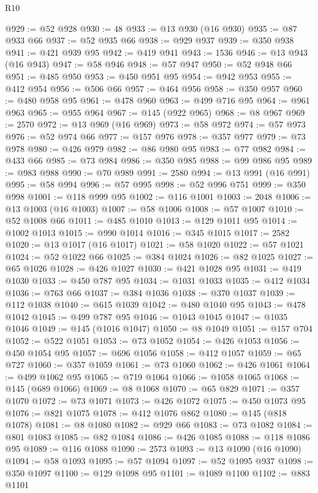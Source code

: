 \begin{lexlean}{R10}
\begin{coremodule}
@929 := @52 @928
@930 := 48
@933 := @13 @930 (@16 @930)
@935 := @87 @933 @66
@937 := @52 @935 @66
@938 := @929 @937
@939 := @350 @938
@941 := @421 @939 @95
@942 := @419 @941
@943 := 1536
@946 := @13 @943 (@16 @943)
@947 := @58 @946
@948 := @57 @947
@950 := @52 @948 @66
@951 := @485 @950
@953 := @450 @951 @95
@954 := @942 @953
@955 := @412 @954
@956 := @506 @66
@957 := @464 @956
@958 := @350 @957
@960 := @480 @958 @95
@961 := @478 @960
@963 := @499 @716 @95
@964 := @961 @963
@965 := @955 @964
@967 := @145 (@922 @965)
@968 := @8 @967
@969 := 2570
@972 := @13 @969 (@16 @969)
@973 := @58 @972
@974 := @57 @973
@976 := @52 @974 @66
@977 := @157 @976
@978 := @357 @977
@979 := @73 @978
@980 := @426 @979
@982 := @86 @980 @95
@983 := @77 @982
@984 := @433 @66
@985 := @73 @984
@986 := @350 @985
@988 := @99 @986 @95
@989 := @983 @988
@990 := @70 @989
@991 := 2580
@994 := @13 @991 (@16 @991)
@995 := @58 @994
@996 := @57 @995
@998 := @52 @996 @751
@999 := @350 @998
@1001 := @118 @999 @95
@1002 := @116 @1001
@1003 := 2048
@1006 := @13 @1003 (@16 @1003)
@1007 := @58 @1006
@1008 := @57 @1007
@1010 := @52 @1008 @66
@1011 := @485 @1010
@1013 := @129 @1011 @95
@1014 := @1002 @1013
@1015 := @990 @1014
@1016 := @345 @1015
@1017 := 2582
@1020 := @13 @1017 (@16 @1017)
@1021 := @58 @1020
@1022 := @57 @1021
@1024 := @52 @1022 @66
@1025 := @384 @1024
@1026 := @82 @1025
@1027 := @65 @1026
@1028 := @426 @1027
@1030 := @421 @1028 @95
@1031 := @419 @1030
@1033 := @450 @787 @95
@1034 := @1031 @1033
@1035 := @412 @1034
@1036 := @763 @66
@1037 := @384 @1036
@1038 := @370 @1037
@1039 := @112 @1038
@1040 := @615 @1039
@1042 := @480 @1040 @95
@1043 := @478 @1042
@1045 := @499 @787 @95
@1046 := @1043 @1045
@1047 := @1035 @1046
@1049 := @145 (@1016 @1047)
@1050 := @8 @1049
@1051 := @157 @704
@1052 := @522 @1051
@1053 := @73 @1052
@1054 := @426 @1053
@1056 := @450 @1054 @95
@1057 := @696 @1056
@1058 := @412 @1057
@1059 := @65 @727
@1060 := @357 @1059
@1061 := @73 @1060
@1062 := @426 @1061
@1064 := @499 @1062 @95
@1065 := @719 @1064
@1066 := @1058 @1065
@1068 := @145 (@689 @1066)
@1069 := @8 @1068
@1070 := @65 @829
@1071 := @357 @1070
@1072 := @73 @1071
@1073 := @426 @1072
@1075 := @450 @1073 @95
@1076 := @821 @1075
@1078 := @412 @1076 @862
@1080 := @145 (@818 @1078)
@1081 := @8 @1080
@1082 := @929 @66
@1083 := @73 @1082
@1084 := @801 @1083
@1085 := @82 @1084
@1086 := @426 @1085
@1088 := @118 @1086 @95
@1089 := @116 @1088
@1090 := 2573
@1093 := @13 @1090 (@16 @1090)
@1094 := @58 @1093
@1095 := @57 @1094
@1097 := @52 @1095 @937
@1098 := @350 @1097
@1100 := @129 @1098 @95
@1101 := @1089 @1100
@1102 := @883 @1101

\end{coremodule}
\end{lexlean}
